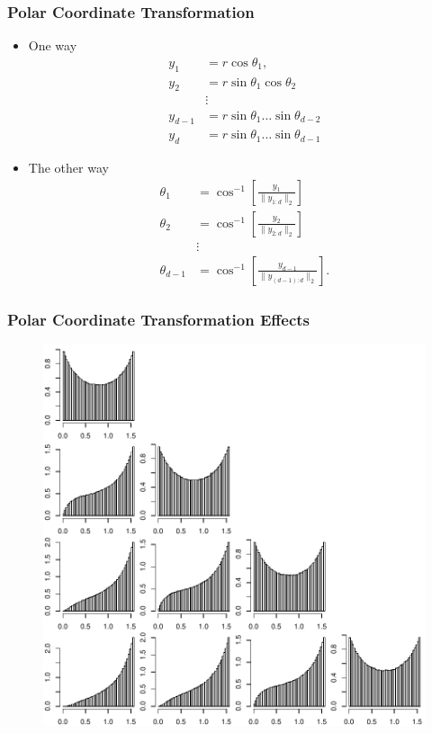 \documentclass[aspectratio=169]{beamer}
\begin{document}
\begin{frame}
  \frametitle{Polar Coordinate Transformation}
  \begin{itemize}
    \item One way
      \begin{equation*}
        \begin{aligned}
          y_1     &= r\cos\theta_1,\\
          y_2     &= r\sin\theta_1\cos\theta_2\\
                  &\vdots\\
          y_{d-1} &= r\sin\theta_1\ldots\sin\theta_{d-2}\\
          y_{d}   &= r\sin\theta_1\ldots\sin\theta_{d-1}
        \end{aligned}
      \end{equation*}
    \item The other way
      \begin{equation*}
        \begin{aligned}
          \theta_1     &= \cos^{-1}\left[\frac{y_1}{\lVert y_{1:d}\rVert_2}\right]\\
          \theta_2     &= \cos^{-1}\left[\frac{y_2}{\lVert y_{2:d}\rVert_2}\right]\\
                       &\vdots\\
          \theta_{d-1} &= \cos^{-1}\left[\frac{y_{d-1}}{\lVert y_{(d-1):d}\rVert_2}\right].
        \end{aligned}
      \end{equation*}
  \end{itemize}
\end{frame}

\begin{frame}
  \frametitle{Polar Coordinate Transformation Effects}
  \begin{figure}
    \centering
    \includegraphics[scale = 0.5]{./images/independent_transformed}
	\end{figure}
\end{frame}
\end{document}
